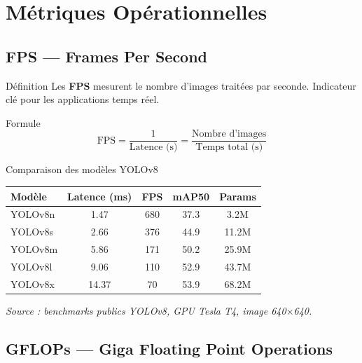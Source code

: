 \documentclass[12pt, a4paper]{report}
\begin{document}
\chapter{Métriques Opérationnelles}

\section{FPS — Frames Per Second}

\begin{definitionbox}{Définition}
  Les \textbf{FPS} mesurent le nombre d'images traitées par seconde. Indicateur
  clé pour les applications temps réel.
\end{definitionbox}

\begin{formulebox}{Formule}
  \[
    \text{FPS} = \frac{1}{\text{Latence (s)}} = \frac{\text{Nombre d'images}}{\text{Temps total (s)}}
  \]
\end{formulebox}

\begin{examplebox}{Comparaison des modèles YOLOv8}
  \begin{center}
  \begin{tabular}{lcccc}
    \toprule
    \textbf{Modèle} & \textbf{Latence (ms)} & \textbf{FPS} & \textbf{mAP50} & \textbf{Params} \\
    \midrule
    YOLOv8n & 1.47 & 680 & 37.3 & 3.2M \\
    YOLOv8s & 2.66 & 376 & 44.9 & 11.2M \\
    YOLOv8m & 5.86 & 171 & 50.2 & 25.9M \\
    YOLOv8l & 9.06 & 110 & 52.9 & 43.7M \\
    YOLOv8x & 14.37 & 70  & 53.9 & 68.2M \\
    \bottomrule
  \end{tabular}
  \end{center}
  \textit{Source : benchmarks publics YOLOv8, GPU Tesla T4, image 640$\times$640.}
\end{examplebox}

\section{GFLOPs — Giga Floating Point Operations}
\end{document}
